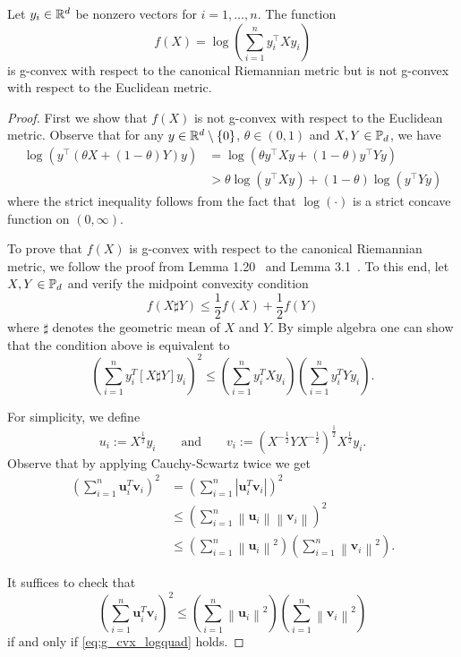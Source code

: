 \documentclass[twoside,11pt]{article}
\begin{document}
\begin{prop}\label{prop:log_quad_gcvx}
    Let $y_i \in \mathbb{R}^d$ be nonzero vectors for $i = 1, \ldots, n$. The function 
    \[
    f(X) = \log \left(\sum_{i=1}^n y_i^\top X y_i  \right)
    \]
    is g-convex with respect to the canonical Riemannian metric but is not g-convex with respect to the Euclidean metric.
\end{prop}
\begin{proof}
    First we show that $f(X)$ is not g-convex with respect to the Euclidean metric. Observe that for any $y \in \mathbb{R}^d \setminus \{0\}$,  $\theta \in (0,1)$ and $X, Y \in \mathbb{P}_d$, we have
    \[
    \begin{aligned}
        \log \left(y^\top \left(\theta X + (1-\theta)Y\right) y \right) &= \log \left(\theta y^\top X y + (1-\theta)y^\top Y y\right) 
        \\&> \theta \log \left(y^\top X y\right) + (1- \theta) \log \left(y^\top Y y \right)
    \end{aligned}
    \]
    where the strict inequality follows from the fact that $\log(\cdot)$ is a strict concave function on $(0, \infty)$. 

    To prove that $f(X)$ is g-convex with respect to the canonical Riemannian metric, we follow the proof from Lemma 1.20~\citep{wieselstructuredcovariance} and Lemma 3.1~\citep{zhang2016robust}. To this end, let $X,Y \in \mathbb{P}_d$ and verify the midpoint convexity condition
    \[
    f(X \sharp Y) \leq \frac{1}{2}f(X) + \frac{1}{2}f(Y)
    \]
    where $\sharp$ denotes the geometric mean of $X$ and $Y$. By simple algebra one can show that the condition above is equivalent to 
    \begin{equation}\label{eq:g_cvx_logquad}
        \left(\sum_{i=1}^n {y}_i^T[X \sharp Y] {y}_i\right)^2 \leq\left(\sum_{i=1}^n y_i^T X {y}_i\right)\left(\sum_{i=1}^n y_i^T Y {y}_i\right).
    \end{equation}
    
    For simplicity, we define 
    \[
    u_i := X^{\frac{1}{2}}y_i \qquad \text{and} \qquad v_i := \left(X^{-\frac{1}{2}}Y X^{-\frac{1}{2}}\right)^{\frac{1}{2}}X^{\frac{1}{2}}y_i.
    \]
    Observe that by applying Cauchy-Scwartz twice we get
    \[
    \begin{aligned}
\left(\sum_{i=1}^n \mathbf{u}_i^T \mathbf{v}_i\right)^2 & =\left(\sum_{i=1}^n\left|\mathbf{u}_i^T \mathbf{v}_i\right|\right)^2 \\
& \leq\left(\sum_{i=1}^n\left\|\mathbf{u}_i\right\|\left\|\mathbf{v}_i\right\|\right)^2 \\
& \leq\left(\sum_{i=1}^n\left\|\mathbf{u}_i\right\|^2\right)\left(\sum_{i=1}^n\left\|\mathbf{v}_i\right\|^2\right).
\end{aligned}
\]

It suffices to check that 
\[
\left(\sum_{i=1}^n \mathbf{u}_i^T \mathbf{v}_i\right)^2 \leq\left(\sum_{i=1}^n\left\|\mathbf{u}_i\right\|^2\right)\left(\sum_{i=1}^n\left\|\mathbf{v}_i\right\|^2\right)
\]
if and only if \eqref{eq:g_cvx_logquad} holds.
\end{proof}
\end{document}
